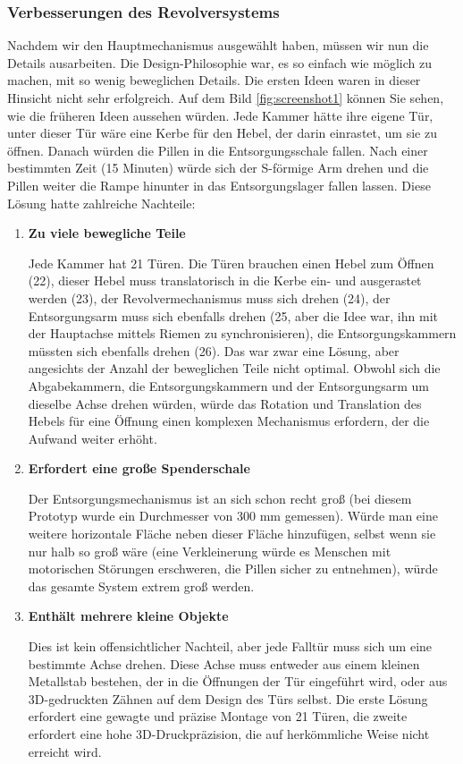 \subsubsection{Verbesserungen des Revolversystems}
Nachdem wir den Hauptmechanismus ausgewählt haben, müssen wir nun die Details ausarbeiten. Die Design-Philosophie war, es so einfach wie möglich zu machen, mit so wenig beweglichen Details. Die ersten Ideen waren in dieser Hinsicht nicht sehr erfolgreich. Auf dem Bild \ref{fig:screenshot1} können Sie sehen, wie die früheren Ideen aussehen würden. Jede Kammer hätte ihre eigene Tür, unter dieser Tür wäre eine Kerbe für den Hebel, der darin einrastet, um sie zu öffnen. Danach würden die Pillen in die Entsorgungsschale fallen. Nach einer bestimmten Zeit (15 Minuten) würde sich der S-förmige Arm drehen und die Pillen weiter die Rampe hinunter in das Entsorgungslager fallen lassen. Diese Lösung hatte zahlreiche Nachteile:
\begin{enumerate}
	\item{\textbf{Zu viele bewegliche Teile}}
	
	Jede Kammer hat 21 Türen. Die Türen brauchen einen Hebel zum Öffnen (22), dieser Hebel muss translatorisch in die Kerbe ein- und ausgerastet werden (23), der Revolvermechanismus muss sich drehen (24), der Entsorgungsarm muss sich ebenfalls drehen (25, aber die Idee war, ihn mit der Hauptachse mittels Riemen zu synchronisieren), die Entsorgungskammern müssten sich ebenfalls drehen (26). Das war zwar eine Lösung, aber angesichts der Anzahl der beweglichen Teile nicht optimal. Obwohl sich die Abgabekammern, die Entsorgungskammern und der Entsorgungsarm um dieselbe Achse drehen würden, würde das Rotation und Translation des Hebels für eine Öffnung einen komplexen Mechanismus erfordern, der die Aufwand weiter erhöht.
	\item{\textbf{Erfordert eine große Spenderschale}}
	
	Der Entsorgungsmechanismus ist an sich schon recht groß (bei diesem Prototyp wurde ein Durchmesser von 300 mm gemessen). Würde man eine weitere horizontale Fläche neben dieser Fläche hinzufügen, selbst wenn sie nur halb so groß wäre (eine Verkleinerung würde es Menschen mit motorischen Störungen erschweren, die Pillen sicher zu entnehmen), würde das gesamte System extrem groß werden.
	\item{\textbf{Enthält mehrere kleine Objekte}}
	
	Dies ist kein offensichtlicher Nachteil, aber jede Falltür muss sich um eine bestimmte Achse drehen. Diese Achse muss entweder aus einem kleinen Metallstab bestehen, der in die Öffnungen der Tür eingeführt wird, oder aus 3D-gedruckten Zähnen auf dem Design des Türs selbst. Die erste Lösung erfordert eine gewagte und präzise Montage von 21 Türen, die zweite erfordert eine hohe 3D-Druckpräzision, die auf herkömmliche Weise nicht erreicht wird.
\end{enumerate}
